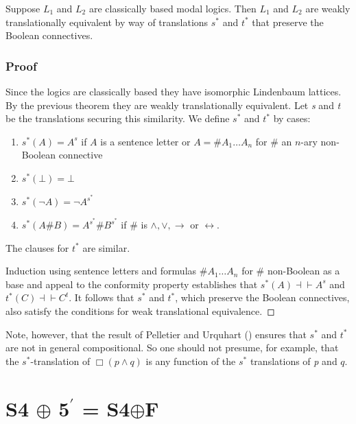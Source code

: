 \documentclass[
  11pt,
  letterpaper,
  DIV=11,
  numbers=noendperiod,
  twoside]{scrartcl}
\providecommand{\tightlist}{%
  \setlength{\itemsep}{0pt}\setlength{\parskip}{0pt}}
\begin{document}
Suppose \(L_1\) and \(L_2\) are classically based modal logics. Then
\(L_1\) and \(L_2\) are weakly translationally equivalent by way of
translations \(s^*\) and \(t^*\) that preserve the Boolean connectives.

\subsubsection*{Proof}\label{proof-4}

Since the logics are classically based they have isomorphic Lindenbaum
lattices. By the previous theorem they are weakly translationally
equivalent. Let \emph{s} and \emph{t} be the translations securing this
similarity. We define \(s^*\) and \(t^*\) by cases:

\begin{enumerate}
\def\labelenumi{\arabic{enumi}.}
\tightlist
\item
  \(s^*(A)=A^s\) if \(A\) is a sentence letter or
  \(A = {\#}A_1{\ldots}A_n\) for \({\#}\) an \(n\)-ary non-Boolean
  connective
\item
  \(s^{*}(\bot)=\bot\)
\item
  \(s^{*}(\neg A)= \neg A^{s^{*}}\)
\item
  \(s^{*}(A{\#}B) = A^{s^{*}}\!{\#} B^{s^{*}}\) if \({\#}\) is
  \(\wedge ,\vee ,\rightarrow\) or \(\leftrightarrow\).
\end{enumerate}

The clauses for \(t^*\) are similar.

Induction using sentence letters and formulas \({\#}A_1{\ldots}A_n\) for
\({\#}\) non-Boolean as a base and appeal to the conformity property
establishes that \(s^*\!(A){\dashv}{\vdash}A^s\) and
\(t^*(C){\dashv}{\vdash}C^t\). It follows that \(s^*\) and \(t^*\),
which preserve the Boolean connectives, also satisfy the conditions for
weak translational equivalence.~◻

Note, however, that the result of Pelletier and Urquhart
() ensures that \(s^*\) and
\(t^*\) are not in general compositional. So one should not presume, for
example, that the \(s^*\)-translation of \(\Box (p\wedge q)\) is any
function of the \(s^*\) translations of \emph{p} and \(q\).

\section{\texorpdfstring{S4 \(\oplus\) 5\(^\prime\) =
S4\(\oplus\)F}{S4 \textbackslash oplus 5\^{}\textbackslash prime = S4\textbackslash oplusF}}\label{s4-oplus-5prime-s4oplusf}
\end{document}
